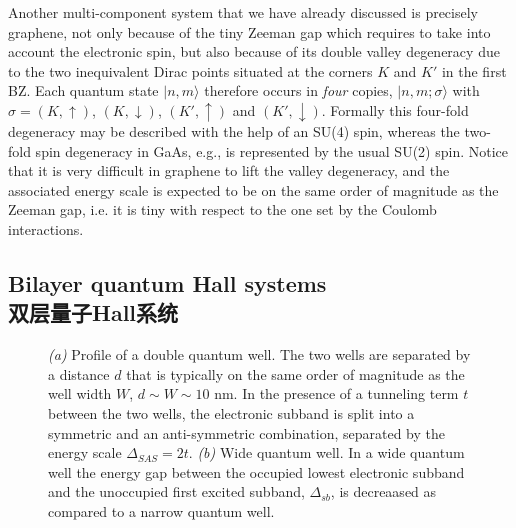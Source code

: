 \documentclass[10pt]{book}
\newcommand{\ua}{\uparrow}
\newcommand{\da}{\downarrow}
\begin{document}
Another multi-component system that we have already discussed is precisely graphene, not only because of the tiny
Zeeman gap which requires to take into account the electronic spin, but also because of its double valley degeneracy
due to the two inequivalent Dirac points situated at the corners $K$ and $K'$ in the first BZ. Each quantum state
$|n,m\rangle$ therefore occurs in {\sl four} copies, $|n,m;\sigma\rangle$ with $\sigma=(K,\ua)$, $(K,\da)$, $(K',\ua)$
and $(K',\da)$. Formally this four-fold degeneracy may be described with the help of an SU(4) spin, whereas 
the two-fold spin degeneracy in GaAs, e.g., is represented by the usual SU(2) spin. Notice that it is very 
difficult in graphene to lift the valley degeneracy, and the associated energy scale is expected to be on the same order
of magnitude as the Zeeman gap, i.e. it is tiny with respect to the one set by the Coulomb interactions. 

\subsection[双层量子Hall系统]{Bilayer quantum Hall systems\\\bf 双层量子Hall系统}

\begin{figure}
\begin{center}
\end{center}
\caption{ {\sl (a)} Profile of a double quantum well. The two wells are separated by a distance $d$ that is typically on the same
order of magnitude as the well width $W$, $d\sim W\sim 10$ nm. In the presence of a tunneling term $t$ between the two
wells, the electronic subband is split into a symmetric and an anti-symmetric combination, separated by the 
energy scale $\Delta_{SAS}=2t$.
{\sl (b)} Wide quantum well. In a wide quantum well the energy gap between the occupied lowest electronic subband and the
unoccupied first excited subband, $\Delta_{sb}$, is decreaased as compared to a narrow quantum well.}
\label{fig24}
\end{figure}
\end{document}
